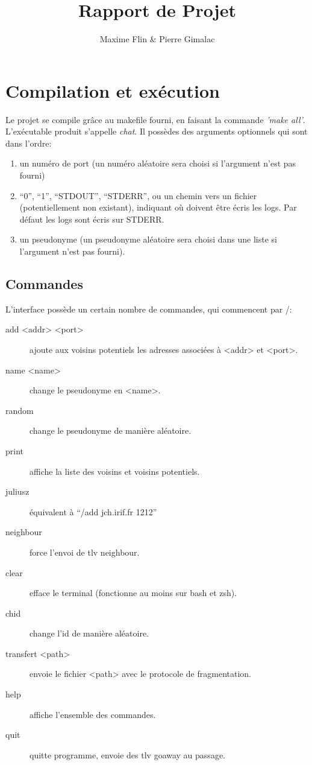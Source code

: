 \documentclass[a4paper,10pt]{article} %
\author{Maxime Flin \& Pierre Gimalac}
\title{Rapport de Projet}
\begin{document}
\maketitle

\section{Compilation et exécution}
Le projet se compile grâce au makefile fourni, en faisant la commande \textit{'make all'}.\\

L'exécutable produit s'appelle \textit{chat}. Il possèdes des arguments optionnels qui sont dans l'ordre:
\begin{enumerate}
\item un numéro de port (un numéro aléatoire sera choisi si l'argument n'est pas fourni)
\item ``0'', ``1'', ``STDOUT'', ``STDERR'', ou un chemin vers un fichier (potentiellement non existant), indiquant où doivent être écris les logs. Par défaut les logs sont écris sur STDERR.
\item un pseudonyme (un pseudonyme aléatoire sera choisi dans une liste si l'argument n'est pas fourni).
\end{enumerate}

\subsection{Commandes}
L'interface possède un certain nombre de commandes, qui commencent par /:
\begin{description}
\item[add <addr> <port>] ajoute aux voisins potentiels les adresses associées à <addr> et <port>.
\item[name <name>] change le pseudonyme en <name>.
\item[random] change le pseudonyme de manière aléatoire.
\item[print] affiche la liste des voisins et voisins potentiels.
\item[juliusz] équivalent à ``/add jch.irif.fr 1212''
\item[neighbour] force l'envoi de tlv neighbour.
\item[clear] efface le terminal (fonctionne au moins sur bash et zsh).
\item[chid] change l'id de manière aléatoire.
\item[transfert <path>] envoie le fichier <path> avec le protocole de fragmentation.
\item[help] affiche l'ensemble des commandes.
\item[quit] quitte programme, envoie des tlv goaway au passage.
\end{description}
\end{document}
